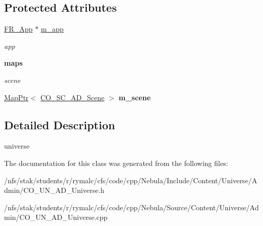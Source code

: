 \subsection*{Protected Attributes}
\begin{DoxyCompactItemize}
\item 
\hypertarget{classContent_1_1Universe_1_1Admin_1_1Universe_a3fd8cf38d190c33fe322d42af3caf783}{
\hyperlink{classFramework_1_1App}{FR\_\-App} $\ast$ \hyperlink{classContent_1_1Universe_1_1Admin_1_1Universe_a3fd8cf38d190c33fe322d42af3caf783}{m\_\-app}}
\label{classContent_1_1Universe_1_1Admin_1_1Universe_a3fd8cf38d190c33fe322d42af3caf783}

\begin{DoxyCompactList}\small\item\em app \item\end{DoxyCompactList}\end{DoxyCompactItemize}
\begin{Indent}{\bf maps}\par
{\em \label{_amgrp7e94476d62556cc8501e3df5b8d6470d}
 scene }\begin{DoxyCompactItemize}
\item 
\hypertarget{classContent_1_1Universe_1_1Admin_1_1Universe_a0cee70e647c09deb7584801ce41fa4af}{
\hyperlink{classMapPtr}{MapPtr}$<$ \hyperlink{classContent_1_1CO__SC__AD__Scene}{CO\_\-SC\_\-AD\_\-Scene} $>$ {\bfseries m\_\-scene}}
\label{classContent_1_1Universe_1_1Admin_1_1Universe_a0cee70e647c09deb7584801ce41fa4af}

\end{DoxyCompactItemize}
\end{Indent}


\subsection{Detailed Description}
universe 

The documentation for this class was generated from the following files:\begin{DoxyCompactItemize}
\item 
/nfs/stak/students/r/rymalc/cfs/code/cpp/Nebula/Include/Content/Universe/Admin/CO\_\-UN\_\-AD\_\-Universe.h\item 
/nfs/stak/students/r/rymalc/cfs/code/cpp/Nebula/Source/Content/Universe/Admin/CO\_\-UN\_\-AD\_\-Universe.cpp\end{DoxyCompactItemize}
